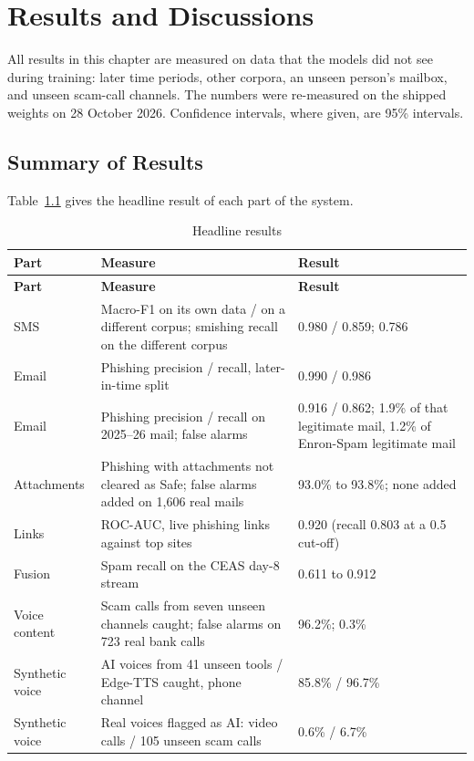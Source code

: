\chapter{Results and Discussions}\thispagestyle{thesisstyle} %
\graphicspath{{Chapter8/figures/}}
{

All results in this chapter are measured on data that the models did not see during training: later time periods, other corpora, an unseen person's mailbox, and unseen scam-call channels. The numbers were re-measured on the shipped weights on 28 October 2026. Confidence intervals, where given, are 95\% intervals.

\section{Summary of Results}
Table~\ref{tab:headline} gives the headline result of each part of the system.

{\small{}
\begin{longtable}{|p{2.5cm}|p{6.0cm}|p{5.7cm}|}
\caption{Headline results}\label{tab:headline}\\
\hline \textbf{Part} & \textbf{Measure} & \textbf{Result} \\ \hline
\endfirsthead
\hline \textbf{Part} & \textbf{Measure} & \textbf{Result} \\ \hline
\endhead
\hline
\endfoot
SMS & Macro-F1 on its own data / on a different corpus; smishing recall on the different corpus & 0.980 / 0.859; 0.786 \\ \hline
Email & Phishing precision / recall, later-in-time split & 0.990 / 0.986 \\ \hline
Email & Phishing precision / recall on 2025--26 mail; false alarms & 0.916 / 0.862; 1.9\% of that legitimate mail, 1.2\% of Enron-Spam legitimate mail \\ \hline
Attachments & Phishing with attachments not cleared as Safe; false alarms added on 1{,}606 real mails & 93.0\% to 93.8\%; none added \\ \hline
Links & ROC-AUC, live phishing links against top sites & 0.920 (recall 0.803 at a 0.5 cut-off) \\ \hline
Fusion & Spam recall on the CEAS day-8 stream & 0.611 to 0.912 \\ \hline
Voice content & Scam calls from seven unseen channels caught; false alarms on 723 real bank calls & 96.2\%; 0.3\% \\ \hline
Synthetic voice & AI voices from 41 unseen tools / Edge-TTS caught, phone channel & 85.8\% / 96.7\% \\ \hline
Synthetic voice & Real voices flagged as AI: video calls / 105 unseen scam calls & 0.6\% / 6.7\% \\ \hline
\end{longtable}
}

}
